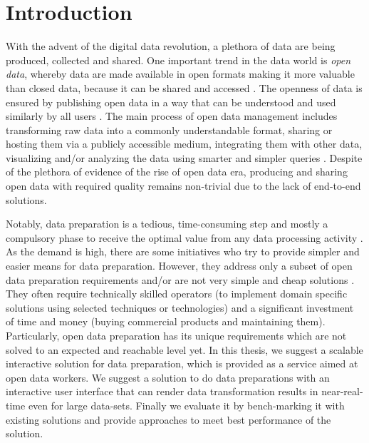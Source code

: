 
\chapter{Introduction} %
\label{Chapter1} %



\noindent With the advent of the digital data revolution, a plethora of data are being produced, collected and shared. One important trend in the data world is \textit{open data}, whereby data are made available in open formats making it more valuable  than closed data, because it can be shared and accessed \citep{opendataunlockinginnovation}. The openness of data is ensured by publishing open data in a way that can be understood and used similarly by all users \cite{opendatahandbook}. The main process of open data management includes transforming raw data into a commonly understandable format, sharing or hosting them via a publicly accessible medium, integrating them with other data, visualizing and/or analyzing the data using smarter and simpler queries \cite{howlinkeddataistransforminggovernment}. Despite of the plethora of evidence of the rise of open data era, producing and sharing  open data with required quality remains non-trivial \cite{towardsopendatadevelopmentmodelforlinkeddata} due to the lack of end-to-end solutions. 

\noindent Notably, data preparation is a tedious, time-consuming step and mostly a compulsory phase to receive the optimal value from any data processing activity \cite{datapreparationfordatamining}. As the demand is high, there are some initiatives who try to provide simpler and easier means for data preparation. However, they address only a subset of open data preparation requirements and/or are not very simple and cheap solutions \cite{ligthweightopendatatransformation} \cite{cleaningprobsandapproaches} \cite{declarativedatacleaning} \cite{visualizationsandtransformationsinwrangling}. They often require technically skilled operators (to implement domain specific solutions using selected techniques or technologies) and a significant investment of time and money (buying commercial products and maintaining them). Particularly, open data preparation has its unique requirements which are not solved to an expected and reachable level yet. In this thesis, we suggest a scalable interactive solution for data preparation, which is provided as a service aimed at open data workers. We suggest a solution to do data preparations with an interactive user interface that can render data transformation results in near-real-time even for large data-sets. Finally we evaluate it by bench-marking it with existing solutions and provide approaches to meet best performance of the solution.


